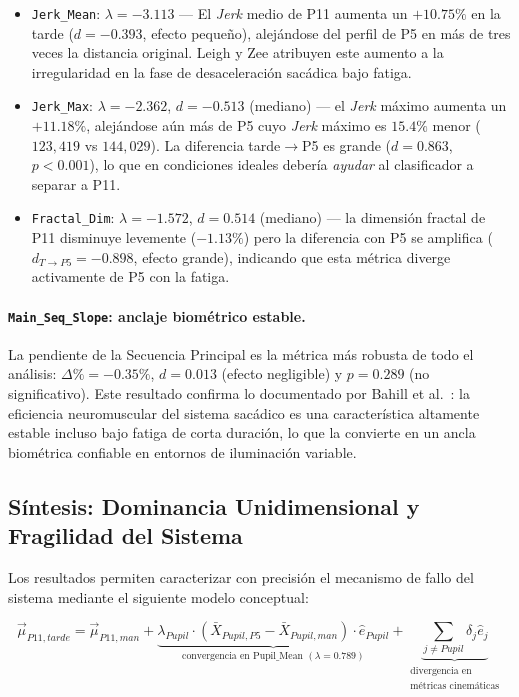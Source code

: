 \begin{itemize}
	\item \texttt{Jerk\_Mean}: $\lambda = -3.113$ — El \textit{Jerk} medio de P11
	aumenta un $+10.75\%$ en la tarde ($d = -0.393$, efecto pequeño),
	alejándose del perfil de P5 en más de tres veces la distancia
	original.
	Leigh y Zee \cite{leigh2015neurology} atribuyen este
	aumento a la irregularidad en la fase de desaceleración sacádica
	bajo fatiga.
	\item \texttt{Jerk\_Max}: $\lambda = -2.362$, $d = -0.513$ (mediano)
	— el \textit{Jerk} máximo aumenta un $+11.18\%$, alejándose aún más de P5
	cuyo \textit{Jerk} máximo es $\mathbf{15.4\%}$ menor ($123{,}419$ vs
	$144{,}029$).
	La diferencia tarde$\to$P5 es grande ($d = 0.863$,
	$p < 0.001$), lo que en condiciones ideales debería \textit{ayudar}
	al clasificador a separar a P11.
	\item \texttt{Fractal\_Dim}: $\lambda = -1.572$, $d = 0.514$
	(mediano) — la dimensión fractal de P11 disminuye levemente
	($-1.13\%$) pero la diferencia con P5 se amplifica
	($d_{T\to P5} = -0.898$, efecto grande), indicando que esta
	métrica diverge activamente de P5 con la fatiga.
\end{itemize}

\paragraph{\texttt{Main\_Seq\_Slope}: anclaje biométrico estable.}
La pendiente de la Secuencia Principal es la métrica más robusta de
todo el análisis: $\Delta\% = -0.35\%$, $d = 0.013$ (efecto
negligible) y $p = 0.289$ (no significativo).
Este resultado confirma
lo documentado por Bahill et al.\ \cite{bahill1975}: la eficiencia
neuromuscular del sistema sacádico es una característica altamente
estable incluso bajo fatiga de corta duración, lo que la convierte
en un ancla biométrica confiable en entornos de iluminación variable.
\subsection{Síntesis: Dominancia Unidimensional y Fragilidad del Sistema}

Los resultados permiten caracterizar con precisión el mecanismo de fallo
del sistema mediante el siguiente modelo conceptual:

\begin{equation}
	\vec{\mu}_{P11,tarde} = \vec{\mu}_{P11,man}
	+ \underbrace{\lambda_{Pupil} \cdot
		(\bar{X}_{Pupil,P5} - \bar{X}_{Pupil,man}) \cdot \hat{e}_{Pupil}}_{
		\text{convergencia en Pupil\_Mean } (\lambda=0.789)}
	+ \underbrace{\sum_{j \neq Pupil} \delta_j \hat{e}_j}_{\substack{
			\text{divergencia en} \\ \text{métricas cinemáticas}}}
	\label{eq:modelo_deriva}
\end{equation}

